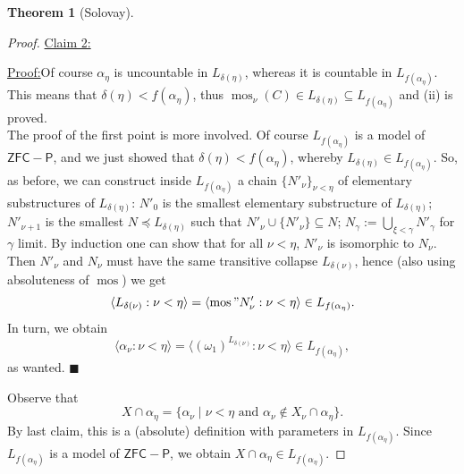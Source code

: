 \documentclass[12pt,a4paper]{report}
\theoremstyle{definition}
\newtheorem{theorem}{Theorem}[chapter] %
\theoremstyle{num.custom-title}
\newenvironment{claim}[1]{\par\noindent\underline{Claim#1:}\space}{} %
\newenvironment{claimproof}[1]{\par\noindent\underline{Proof:}\space#1}{\leavevmode\unskip\penalty9999 \hbox{}\nobreak\hfill\quad\hbox{$\blacksquare$}} %
\DeclareMathOperator{\sse}{\subseteq}
\DeclareMathOperator{\mos}{mos}
\begin{document}
\begin{theorem}[Solovay]
\begin{proof}
\begin{claim}{ 2}
\begin{claimproof}
Of course $\alpha_\eta$ is uncountable in $L_{\delta(\eta)}$, whereas it is countable in $L_{f(\alpha_\eta)}$. This means that $\delta(\eta) < f(\alpha_\eta)$, thus $\mos_\nu(C) \in L_{\delta(\eta)} \sse L_{f(\alpha_\eta)}$ and (ii) is proved.\\[6pt]
%
\indent The proof of the first point is more involved. Of course $L_{f(\alpha_\eta)}$ is a model of $\mathsf{ZFC-P}$, and we just showed that $\delta(\eta) < f(\alpha_\eta)$, whereby $L_{\delta(\eta)} \in L_{f(\alpha_\eta)}$. So, as before, we can construct inside $L_{f(\alpha_\eta)}$ a chain $\{N'_\nu\}_{\nu < \eta}$ of elementary substructures of $L_{\delta(\eta)}$: $N'_0$ is the smallest elementary substructure of $L_{\delta(\eta)}$; $N'_{\nu+1}$ is the smallest $N \preceq L_{\delta(\eta)}$ such that $N'_\nu \cup \{N'_\nu\} \sse N$; $N_\gamma := \bigcup_{\xi < \gamma} N'_\gamma$ for $\gamma$ limit. By induction one can show that for all $\nu < \eta$, $N'_\nu$ is isomorphic to $N_\nu$. Then $N'_\nu$ and $N_\nu$ must have the same transitive collapse $L_{\delta(\nu)}$, hence (also using absoluteness of $\mos$) we get 
\[
\langle L_{\delta(\nu)} : \nu < \eta \rangle = \langle \mos "N'_\nu : \nu < \eta \rangle \in L_{f(\alpha_\eta)}.
\]
In turn, we obtain
\[
\langle \alpha_\nu : \nu < \eta \rangle = \langle (\omega_1)^{L_{\delta(\nu)}} : \nu < \eta \rangle \in L_{f(\alpha_\eta)},
\]
as wanted.
\end{claimproof}
\end{claim}










Observe that
\[
X \cap \alpha_\eta = \{ \alpha_\nu \mid \nu < \eta \text{ and } \alpha_\nu \not\in X_\nu \cap \alpha_\eta \}.
\]
By last claim, this is a (absolute) definition with parameters in $L_{f(\alpha_\eta)}$. Since $L_{f(\alpha_\eta)}$ is a model of $\mathsf{ZFC-P}$, we obtain $X \cap \alpha_\eta \in L_{f(\alpha_\eta)}$.
\end{proof}
\end{theorem}
\end{document}
